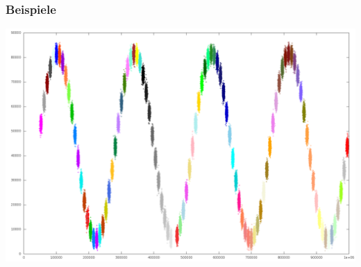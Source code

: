 \documentclass[10pt,utf8]{beamer}
\begin{document}
\begin{frame}
	\frametitle{Beispiele}
	\vspace{-15pt}
	\hspace{-16pt}
	\includegraphics[scale=0.25, keepaspectratio]{../output/pics/sine.png} 
\end{frame}
\end{document}
